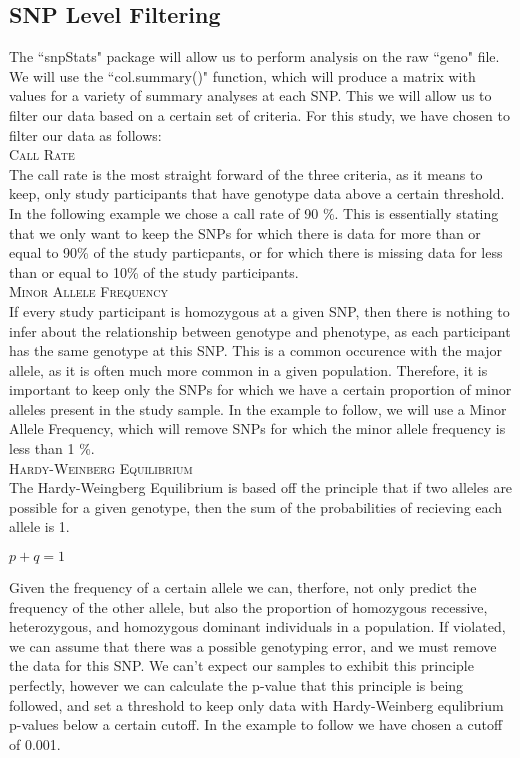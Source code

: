 \documentclass{ar2e}
\begin{document}
\subsection{SNP Level Filtering}
The ``snpStats" package will allow us to perform analysis on the raw ``geno" file.  We will use the ``col.summary()" function, which will produce a matrix with values for a variety of summary analyses at each SNP.
This we will allow us to filter our data based on a certain set of criteria.  For this study, we have chosen to filter our data as follows: \\
\textsc{Call Rate}\\
The call rate is the most straight forward of the three criteria, as it means to keep, only study participants that have genotype data above a certain threshold. In the following example we chose a call rate of 90 \%.  This is essentially stating that we only want to keep the SNPs for which there is data for more than or equal to 90\% of the study particpants, or for which there is missing data for less than or equal to 10\% of the study participants.\\
\textsc{Minor Allele Frequency}\\
If every study participant is homozygous at a given SNP, then there is nothing to infer about the relationship between genotype and phenotype, as each participant has the same genotype at this SNP.  This is a common occurence with the major allele, as it is often much more common in a given population.  Therefore, it is important to keep only the SNPs for which we have a certain proportion of minor alleles present in the study sample.  In the example to follow, we will use a Minor Allele Frequency, which will remove SNPs for which the minor allele frequency is less than 1 \%.\\
\textsc{Hardy-Weinberg Equilibrium}\\
The Hardy-Weingberg Equilibrium is based off the principle that if two alleles are possible for a given genotype, then the sum of the probabilities of recieving each allele is 1.

\centerline{$p+q=1$}

Given the frequency of a certain allele we can, therfore, not only predict the frequency of the other allele, but also the proportion of homozygous recessive, heterozygous, and homozygous dominant individuals in a population. If violated, we can assume that there was a possible genotyping error, and we must remove the data for this SNP. We can't expect our samples to exhibit this principle perfectly, however we can calculate the p-value that this principle is being followed, and set a threshold to keep only data with Hardy-Weinberg equlibrium p-values below a certain cutoff. In the example to follow we have chosen a cutoff of 0.001.
\end{document}
